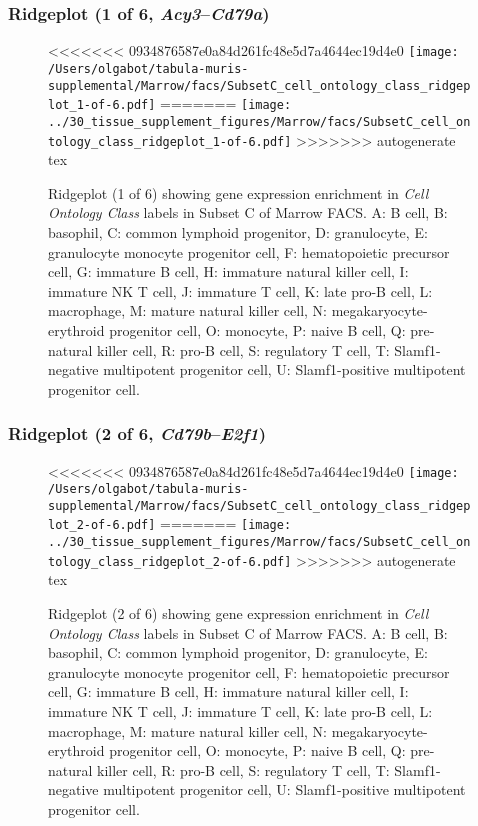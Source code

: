 \subsubsection{Ridgeplot (1 of 6, \emph{Acy3}--\emph{Cd79a})}
\begin{figure}[h]
\centering
<<<<<<< 0934876587e0a84d261fc48e5d7a4644ec19d4e0
\texttt{[image: /Users/olgabot/tabula-muris-supplemental/Marrow/facs/SubsetC\_cell\_ontology\_class\_ridgeplot\_1-of-6.pdf]}
=======
\texttt{[image: ../30\_tissue\_supplement\_figures/Marrow/facs/SubsetC\_cell\_ontology\_class\_ridgeplot\_1-of-6.pdf]}
>>>>>>> autogenerate tex

\caption{ Ridgeplot (1 of 6)  showing gene expression enrichment in \emph{Cell Ontology Class} labels in Subset C of Marrow FACS. A: B cell, B: basophil, C: common lymphoid progenitor, D: granulocyte, E: granulocyte monocyte progenitor cell, F: hematopoietic precursor cell, G: immature B cell, H: immature natural killer cell, I: immature NK T cell, J: immature T cell, K: late pro-B cell, L: macrophage, M: mature natural killer cell, N: megakaryocyte-erythroid progenitor cell, O: monocyte, P: naive B cell, Q: pre-natural killer cell, R: pro-B cell, S: regulatory T cell, T: Slamf1-negative multipotent progenitor cell, U: Slamf1-positive multipotent progenitor cell.}
\end{figure}


\clearpage

\subsubsection{Ridgeplot (2 of 6, \emph{Cd79b}--\emph{E2f1})}
\begin{figure}[h]
\centering
<<<<<<< 0934876587e0a84d261fc48e5d7a4644ec19d4e0
\texttt{[image: /Users/olgabot/tabula-muris-supplemental/Marrow/facs/SubsetC\_cell\_ontology\_class\_ridgeplot\_2-of-6.pdf]}
=======
\texttt{[image: ../30\_tissue\_supplement\_figures/Marrow/facs/SubsetC\_cell\_ontology\_class\_ridgeplot\_2-of-6.pdf]}
>>>>>>> autogenerate tex

\caption{ Ridgeplot (2 of 6)  showing gene expression enrichment in \emph{Cell Ontology Class} labels in Subset C of Marrow FACS. A: B cell, B: basophil, C: common lymphoid progenitor, D: granulocyte, E: granulocyte monocyte progenitor cell, F: hematopoietic precursor cell, G: immature B cell, H: immature natural killer cell, I: immature NK T cell, J: immature T cell, K: late pro-B cell, L: macrophage, M: mature natural killer cell, N: megakaryocyte-erythroid progenitor cell, O: monocyte, P: naive B cell, Q: pre-natural killer cell, R: pro-B cell, S: regulatory T cell, T: Slamf1-negative multipotent progenitor cell, U: Slamf1-positive multipotent progenitor cell.}
\end{figure}


